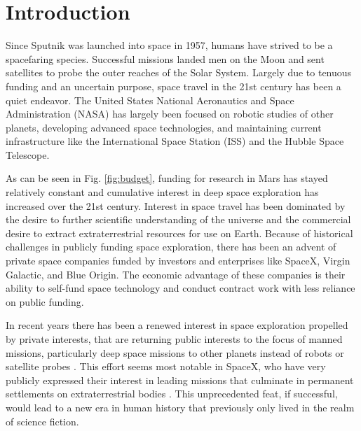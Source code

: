 \section{Introduction}

Since Sputnik was launched into space in 1957, humans have strived to be a spacefaring species.  Successful missions landed men on the Moon and sent satellites to probe the outer reaches of the Solar System. Largely due to tenuous funding and an uncertain purpose, space travel in the 21st century has been a quiet endeavor. The United States National Aeronautics and Space Administration (NASA) has largely been focused on robotic studies of other planets, developing advanced space technologies, and maintaining current infrastructure like the International Space Station (ISS) and the Hubble Space Telescope.

As can be seen in Fig. \ref{fig:budget}, funding for research in Mars has stayed relatively constant and cumulative interest in deep space exploration has increased over the 21st century. Interest in space travel has been dominated by the desire to further scientific understanding of the universe and the commercial desire to extract extraterrestrial resources for use on Earth. Because of historical challenges in publicly funding space exploration, there has been an advent of private space companies funded by investors and enterprises like SpaceX, Virgin Galactic, and Blue Origin. The economic advantage of these companies is their ability to self-fund space technology and conduct contract work \cite{space-contract} with less reliance on public funding.

In recent years there has been a renewed interest in space exploration propelled by private interests, that are returning public interests to the focus of manned missions, particularly deep space missions to other planets instead of robots or satellite probes \cite{nasa-landers}. This effort seems most notable in SpaceX, who have very publicly expressed their interest in leading missions that culminate in permanent settlements on extraterrestrial bodies \cite{spacex-mars-press}. This unprecedented feat, if successful, would lead to a new era in human history that previously only lived in the realm of science fiction.

